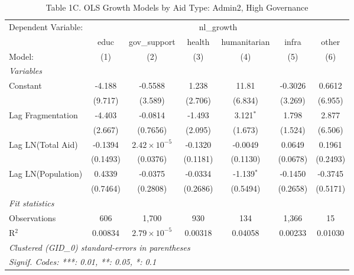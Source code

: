 \begin{table}[htbp]
   \caption{Table 1C. OLS Growth Models by Aid Type: Admin2, High Governance}
   \centering
   \begin{tabular}{lcccccc}
      \tabularnewline \midrule \midrule
      Dependent Variable: & \multicolumn{6}{c}{nl\_growth}\\
                         & educ     & gov\_support          & health   & humanitarian & infra    & other \\   
      Model:             & (1)      & (2)                   & (3)      & (4)          & (5)      & (6)\\  
      \midrule
      \emph{Variables}\\
      Constant           & -4.188   & -0.5588               & 1.238    & 11.81        & -0.3026  & 0.6612\\   
                         & (9.717)  & (3.589)               & (2.706)  & (6.834)      & (3.269)  & (6.955)\\   
      Lag Fragmentation  & -4.403   & -0.0814               & -1.493   & 3.121$^{*}$  & 1.798    & 2.877\\   
                         & (2.667)  & (0.7656)              & (2.095)  & (1.673)      & (1.524)  & (6.506)\\   
      Lag LN(Total Aid)  & -0.1394  & $2.42\times 10^{-5}$  & -0.1320  & -0.0049      & 0.0649   & 0.1961\\   
                         & (0.1493) & (0.0376)              & (0.1181) & (0.1130)     & (0.0678) & (0.2493)\\   
      Lag LN(Population) & 0.4339   & -0.0375               & -0.0334  & -1.139$^{*}$ & -0.1450  & -0.3745\\   
                         & (0.7464) & (0.2808)              & (0.2686) & (0.5494)     & (0.2658) & (0.5171)\\   
      \midrule
      \emph{Fit statistics}\\
      Observations       & 606      & 1,700                 & 930      & 134          & 1,366    & 15\\  
      R$^2$              & 0.00834  & $2.79\times 10^{-5}$  & 0.00318  & 0.04058      & 0.00233  & 0.01030\\  
      \midrule \midrule
      \multicolumn{7}{l}{\emph{Clustered (GID\_0) standard-errors in parentheses}}\\
      \multicolumn{7}{l}{\emph{Signif. Codes: ***: 0.01, **: 0.05, *: 0.1}}\\
   \end{tabular}
\end{table}



